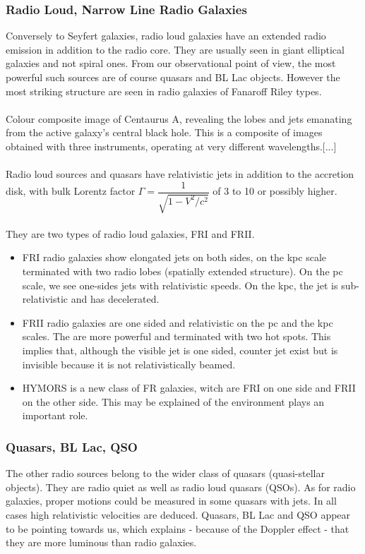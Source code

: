 \documentclass[10pt,a4paper]{article}
\begin{document}
\subsubsection{Radio Loud, Narrow Line Radio Galaxies}
Conversely to Seyfert galaxies, radio loud galaxies have an extended radio emission in addition to the radio core. They are usually seen in giant elliptical galaxies and not spiral ones. From our observational point of view, the most powerful such sources are of course quasars and BL Lac objects. However the most striking structure are seen in radio galaxies of Fanaroff Riley types.\\
\\
Colour composite image of Centaurus A, revealing the lobes and jets emanating from the active galaxy's central black hole. This is a composite of images obtained with three instruments, operating at very different wavelengths.[...]\\
\\
Radio loud sources and quasars have relativistic jets in addition to the accretion disk, with bulk Lorentz factor $\Gamma=\dfrac{1}{\sqrt{1-V^2/c^2}}$ of 3 to 10 or possibly higher.\\
\\
They are two types of radio loud galaxies, FRI and FRII.
\begin{itemize}
\item FRI radio galaxies show elongated jets on both sides, on the kpc scale terminated with two radio lobes (spatially extended structure). On the pc scale, we see one-sides jets with relativistic speeds. On the kpc, the jet is sub-relativistic and has decelerated.
\item FRII radio galaxies are one sided and relativistic on the pc and the kpc scales. The are more powerful and terminated with two hot spots. This implies that, although the visible jet is one sided, counter jet exist but is invisible because it is not relativistically beamed.
\item HYMORS is a new class of FR galaxies, witch are FRI on one side and FRII on the other side. This may be explained of the environment plays an important role.
\end{itemize}
\subsubsection{Quasars, BL Lac, QSO}
The other radio sources belong to the wider class of quasars (quasi-stellar objects). They are radio quiet as well as radio loud quasars (QSOs). As for radio galaxies, proper motions could be measured in some quasars with jets. In all cases high relativistic velocities are deduced. Quasars, BL Lac and QSO appear to be pointing towards us, which explains - because of the Doppler effect - that they are more luminous than radio galaxies.
\end{document}
